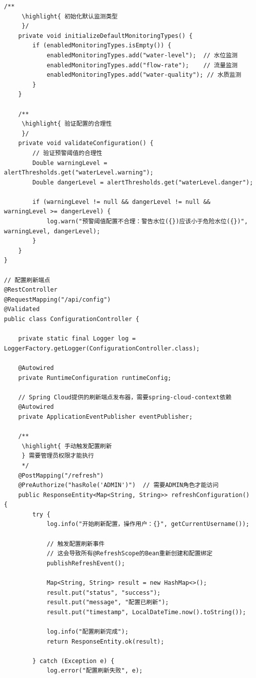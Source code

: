 \begin{lstlisting}[style=java]
    /**
     \highlight{ 初始化默认监测类型
     }/
    private void initializeDefaultMonitoringTypes() {
        if (enabledMonitoringTypes.isEmpty()) {
            enabledMonitoringTypes.add("water-level");  // 水位监测
            enabledMonitoringTypes.add("flow-rate");    // 流量监测
            enabledMonitoringTypes.add("water-quality"); // 水质监测
        }
    }
    
    /**
     \highlight{ 验证配置的合理性
     }/
    private void validateConfiguration() {
        // 验证预警阈值的合理性
        Double warningLevel = alertThresholds.get("waterLevel.warning");
        Double dangerLevel = alertThresholds.get("waterLevel.danger");
        
        if (warningLevel != null && dangerLevel != null && warningLevel >= dangerLevel) {
            log.warn("预警阈值配置不合理：警告水位({})应该小于危险水位({})", warningLevel, dangerLevel);
        }
    }
}

// 配置刷新端点
@RestController
@RequestMapping("/api/config")
@Validated
public class ConfigurationController {
    
    private static final Logger log = LoggerFactory.getLogger(ConfigurationController.class);
    
    @Autowired
    private RuntimeConfiguration runtimeConfig;
    
    // Spring Cloud提供的刷新端点发布器，需要spring-cloud-context依赖
    @Autowired
    private ApplicationEventPublisher eventPublisher;
    
    /**
     \highlight{ 手动触发配置刷新
     } 需要管理员权限才能执行
     */
    @PostMapping("/refresh")
    @PreAuthorize("hasRole('ADMIN')")  // 需要ADMIN角色才能访问
    public ResponseEntity<Map<String, String>> refreshConfiguration() {
        try {
            log.info("开始刷新配置，操作用户：{}", getCurrentUsername());
            
            // 触发配置刷新事件
            // 这会导致所有@RefreshScope的Bean重新创建和配置绑定
            publishRefreshEvent();
            
            Map<String, String> result = new HashMap<>();
            result.put("status", "success");
            result.put("message", "配置已刷新");
            result.put("timestamp", LocalDateTime.now().toString());
            
            log.info("配置刷新完成");
            return ResponseEntity.ok(result);
            
        } catch (Exception e) {
            log.error("配置刷新失败", e);
            

\end{lstlisting}
